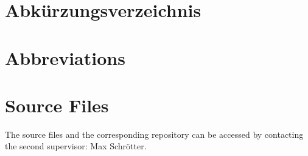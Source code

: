 %
%

\appendix
\pagestyle{appendixstyle}

%
%

\listoffigures

%
%

\listoftables

%
%

\listofalgorithms

\clearpage

%
%

{
\chapter{Abkürzungsverzeichnis}
}{
\chapter{Abbreviations}
}
\begin{acronym}[TDMA]
\end{acronym}

\chapter{Source Files}
The source files and the corresponding repository can be accessed by contacting the second supervisor: Max Schrötter.

%
%

\printbibliography

\printindex 

